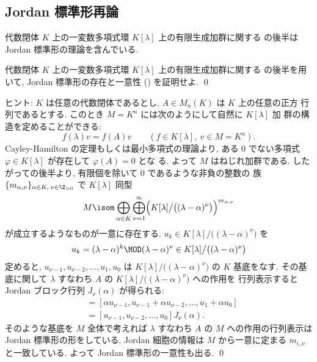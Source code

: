 \documentclass[12pt,twoside]{jarticle}
\begin{document}

\subsection{Jordan 標準形再論}
\label{sec:Jordan-normal-form-2}

代数閉体 $K$ 上の一変数多項式環 $K[\lambda]$ 上の有限生成加群に関する
の後半は Jordan 標準形の理論を含んでいる.

\begin{question}
\label{q:module-to-Jordan}
  代数閉体 $K$ 上の一変数多項式環 $K[\lambda]$ 上の有限生成加群に関する
  の後半を用いて,
  Jordan 標準形の存在と一意性 ()
  を証明せよ.
  \qed
\end{question}

\noindent
ヒント: $K$ は任意の代数閉体であるとし, $A\in M_n(K)$ は $K$ 上の任意の正方
行列であるとする. このとき $M=K^n$ には次のようにして自然に $K[\lambda]$ 加
群の構造を定めることができる:
\begin{equation*}
  f(\lambda)v = f(A)v
  \qquad
  (f\in K[\lambda],\ v\in M=K^n).
\end{equation*}
Cayley-Hamilton の定理もしくは最小多項式の理論より, 
ある $0$ でない多項式 $\varphi\in K[\lambda]$ が存在して $\varphi(A)=0$ とな
る.  よって $M$ はねじれ加群である.  
したがっての後半より,
有限個を除いて $0$ であるような非負の整数の
族 $\{m_{\alpha,\nu}\}_{\alpha\in K,\;\nu\in\Z_{>0}}$ で $K[\lambda]$ 同型
\begin{equation*}
  M \isom 
  \bigoplus_{\alpha\in K}\bigoplus_{\nu=1}^\infty
  \Bigl(
    K[\lambda]\big/\bigl((\lambda-\alpha)^\nu\bigr)
  \Bigr)^{m_{\alpha,\nu}}
\end{equation*}
が成立するようなものが一意に存在する.  
$u_k\in K[\lambda]\big/\bigl((\lambda-\alpha)^\nu\bigr)$ を 
\begin{equation*}
  u_k=(\lambda-\alpha)^k\MOD (\lambda-\alpha)^\nu
  \in K[\lambda]\big/\bigl((\lambda-\alpha)^\nu\bigr)
\end{equation*}
定めると, $u_{\nu-1},u_{\nu-2},\dots,u_1,u_0$ 
は $K[\lambda]\big/\bigl((\lambda-\alpha)^\nu\bigr)$ の $K$ 基底をなす.
その基底に関して $\lambda$ すなわち $A$ 
の $K[\lambda]\big/\bigl((\lambda-\alpha)^\nu\bigr)$ への作用を
行列表示すると Jordan ブロック行列 $J_\nu(\alpha)$ が得られる:
\begin{align*}
  [\lambda u_{\nu-1},\lambda u_{\nu-2},\dots,\lambda u_0]
  &
  = [\alpha u_{\nu-1}, u_{\nu-1}+\alpha u_{\nu-2}, 
     \dots, u_1 + \alpha u_0 ]
  \\ &
  = [u_{\nu-1},u_{\nu-2},\dots,u_0]J_\nu(\alpha).
\end{align*}
そのような基底を $M$ 全体で考えれば $\lambda$ すなわち $A$ の $M$ 
への作用の行列表示は Jordan 標準形の形をしている.
Jordan 細胞の情報は $M$ から一意に定まる $m_{i,\nu}$ と一致している.
よって Jordan 標準形の一意性も出る.
\qed
\end{document}
